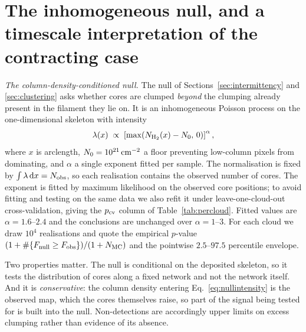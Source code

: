 \documentclass[usenatbib,twoside,twocolumn]{mnras}
\begin{document}
\section{The inhomogeneous null, and a timescale interpretation of the contracting case}
\label{sec:nullspec}

\emph{The column-density-conditioned null.} The null of Sections~\ref{sec:intermittency} and \ref{sec:clustering} asks whether cores are clumped \emph{beyond} the clumping already present in the filament they lie on. It is an inhomogeneous Poisson process on the one-dimensional skeleton with intensity
\begin{equation}
\lambda(x)\;\propto\;\left[\max\!\left(N_{\rm H_2}(x)-N_0,\,0\right)\right]^{\alpha},
\label{eq:nullintensity}
\end{equation}
where $x$ is arclength, $N_0=10^{21}\,{\rm cm^{-2}}$ a floor preventing low-column pixels from dominating, and $\alpha$ a single exponent fitted per sample. The normalisation is fixed by $\int\lambda\,{\rm d}x=N_{\rm obs}$, so each realisation contains the observed number of cores. The exponent is fitted by maximum likelihood on the observed core positions; to avoid fitting and testing on the same data we also refit it under leave-one-cloud-out cross-validation, giving the $p_{\rm cv}$ column of Table~\ref{tab:percloud}. Fitted values are $\alpha=1.6$--$2.4$ and the conclusions are unchanged over $\alpha=1$--$3$. For each cloud we draw $10^4$ realisations and quote the empirical $p$-value $(1+\#\{F_{\rm null}\geq F_{\rm obs}\})/(1+N_{\rm MC})$ and the pointwise $2.5$--$97.5$ percentile envelope.

Two properties matter. The null is conditional on the deposited skeleton, so it tests the distribution of cores along a fixed network and not the network itself. And it is \emph{conservative}: the column density entering Eq.~\ref{eq:nullintensity} is the observed map, which the cores themselves raise, so part of the signal being tested for is built into the null. Non-detections are accordingly upper limits on excess clumping rather than evidence of its absence.
\end{document}

